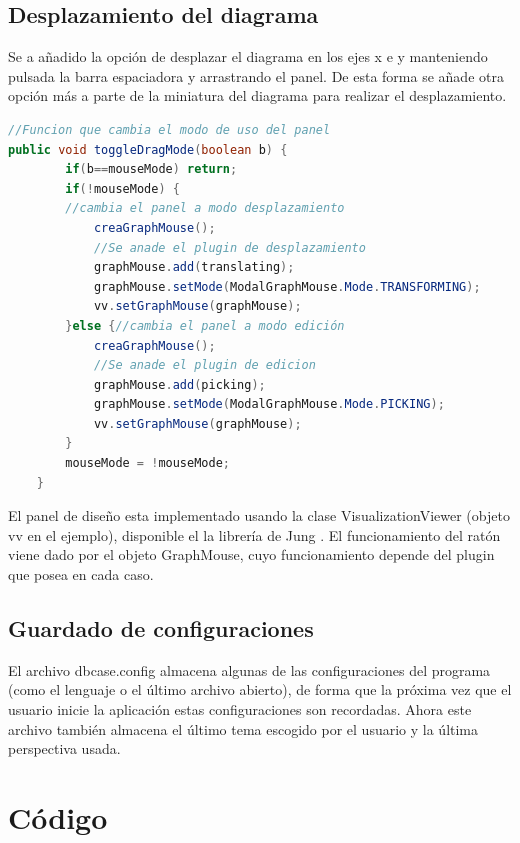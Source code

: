 \subsection{Desplazamiento del diagrama}
Se a añadido la opción de desplazar el diagrama en los ejes x e y manteniendo pulsada la barra espaciadora y arrastrando el panel. De esta forma se añade otra opción más a parte de la miniatura del diagrama para realizar el desplazamiento.
\\

\begin{lstlisting}[xleftmargin = 2cm,language=java]
//Funcion que cambia el modo de uso del panel
public void toggleDragMode(boolean b) {
		if(b==mouseMode) return;
		if(!mouseMode) {
		//cambia el panel a modo desplazamiento
			creaGraphMouse();
			//Se anade el plugin de desplazamiento
			graphMouse.add(translating);
			graphMouse.setMode(ModalGraphMouse.Mode.TRANSFORMING);
			vv.setGraphMouse(graphMouse);
		}else {//cambia el panel a modo edición
			creaGraphMouse();
			//Se anade el plugin de edicion
			graphMouse.add(picking);
			graphMouse.setMode(ModalGraphMouse.Mode.PICKING);
			vv.setGraphMouse(graphMouse);
		}
		mouseMode = !mouseMode;
	}
\end{lstlisting}

El panel de diseño esta implementado usando la clase VisualizationViewer \cite{vv} (objeto vv en el ejemplo), disponible el la librería de Jung \cite{jung}. El funcionamiento del ratón viene dado por el objeto GraphMouse, cuyo funcionamiento depende del plugin que posea en cada caso.
\subsection{Guardado de configuraciones}
El archivo dbcase.config almacena algunas de las configuraciones del programa (como el lenguaje o el último archivo abierto), de forma que la próxima vez que el usuario inicie la aplicación estas configuraciones son recordadas. Ahora este archivo también almacena el último tema escogido por el usuario y la última perspectiva usada.

\section{Código}

